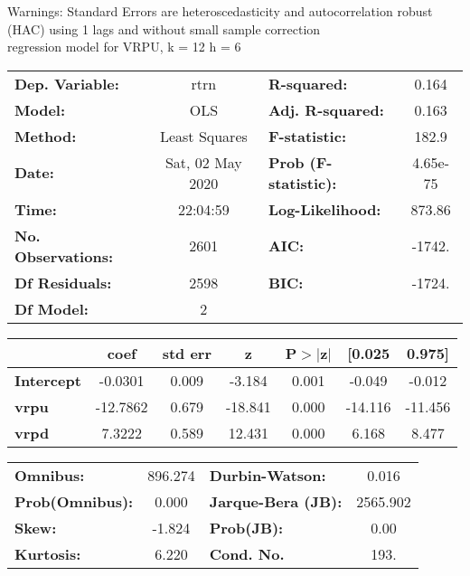 Warnings: \newline
 [1] Standard Errors are heteroscedasticity and autocorrelation robust (HAC) using 1 lags and without small sample correction\\ 

regression model for VRPU, k = 12 h = 6\begin{center}
\begin{tabular}{lclc}
\toprule
\textbf{Dep. Variable:}    &       rtrn       & \textbf{  R-squared:         } &     0.164   \\
\textbf{Model:}            &       OLS        & \textbf{  Adj. R-squared:    } &     0.163   \\
\textbf{Method:}           &  Least Squares   & \textbf{  F-statistic:       } &     182.9   \\
\textbf{Date:}             & Sat, 02 May 2020 & \textbf{  Prob (F-statistic):} &  4.65e-75   \\
\textbf{Time:}             &     22:04:59     & \textbf{  Log-Likelihood:    } &    873.86   \\
\textbf{No. Observations:} &        2601      & \textbf{  AIC:               } &    -1742.   \\
\textbf{Df Residuals:}     &        2598      & \textbf{  BIC:               } &    -1724.   \\
\textbf{Df Model:}         &           2      & \textbf{                     } &             \\
\bottomrule
\end{tabular}
\begin{tabular}{lcccccc}
                   & \textbf{coef} & \textbf{std err} & \textbf{z} & \textbf{P$> |$z$|$} & \textbf{[0.025} & \textbf{0.975]}  \\
\midrule
\textbf{Intercept} &      -0.0301  &        0.009     &    -3.184  &         0.001        &       -0.049    &       -0.012     \\
\textbf{vrpu}      &     -12.7862  &        0.679     &   -18.841  &         0.000        &      -14.116    &      -11.456     \\
\textbf{vrpd}      &       7.3222  &        0.589     &    12.431  &         0.000        &        6.168    &        8.477     \\
\bottomrule
\end{tabular}
\begin{tabular}{lclc}
\textbf{Omnibus:}       & 896.274 & \textbf{  Durbin-Watson:     } &    0.016  \\
\textbf{Prob(Omnibus):} &   0.000 & \textbf{  Jarque-Bera (JB):  } & 2565.902  \\
\textbf{Skew:}          &  -1.824 & \textbf{  Prob(JB):          } &     0.00  \\
\textbf{Kurtosis:}      &   6.220 & \textbf{  Cond. No.          } &     193.  \\
\bottomrule
\end{tabular}
\end{center}

